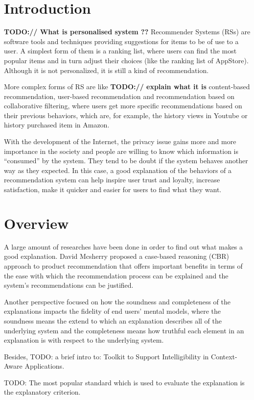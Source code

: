 \section{Introduction}
  \indent \textbf{TODO:// What is personalised system ??}  Recommender Systems (RSs) are software tools and techniques providing suggestions for items to be of use to a user\cite{ricci2011introduction}.
  A simplest form of them is a ranking list, where users  can find the most popular items
  and in turn adjust their choices (like the ranking list of AppStore). Although it is not
  personalized, it is still a kind of recommendation. 
  
  \indent More complex forms of RS are like \textbf{TODO:// explain what it is}
  content-based recommendation, user-based recommendation and recommendation based on 
  collaborative filtering, where users get more specific recommendations based on their 
  previous behaviors, which are, for example, the history views in Youtube or history purchased item in Amazon.
  
  \indent With the development of the Internet, the privacy issue gains more and more importance in the society
  and people are willing to know which information is ``consumed'' by the system. They tend to be doubt if
  the system behaves another way as they expected. In this case, a good explanation of the behaviors of a recommendation system 
  can help inspire user trust and loyalty, increase satisfaction, make it quicker and easier for users to find what they want\cite{tintarev2007survey}.

\section{Overview}
    \indent A large amount of researches have been done in order to find out what makes a good explanation.
    David Mcsherry proposed a case-based reasoning (CBR) approach\cite{mcsherry2005explanation} to product recommendation
    that offers important benefits in terms of the ease with 
    which the recommendation process can be explained and the system\rq s recommendations can be justified.
    
    \indent Another perspective focused on how the soundness and completeness of the explanations impacts the fidelity of end users' mental models\cite{kulesza2013too},
    where the soundness means the extend to which an explanation describes all of the underlying system
    and the completeness means how truthful each element in an explanation is with respect to the underlying system.

    \indent Besides, TODO: a brief intro to: Toolkit to Support Intelligibility in Context-Aware Applications\cite{lim2010toolkit}.
    
    \indent TODO: The most popular standard which is used to evaluate the explanation is the explanatory criterion\cite{tintarev2007survey}.


